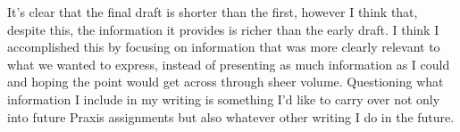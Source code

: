 \documentclass[11pt]{article}
\begin{document}
    It's clear that the final draft is shorter than the first, however I think that, despite this, the information it provides is richer than the early draft. I think I accomplished this by focusing on information that was more clearly relevant to what we wanted to express, instead of presenting as much information as I could and hoping the point would get across through sheer volume. Questioning what information I include in my writing is something I'd like to carry over not only into future Praxis assignments but also whatever other writing I do in the future.






\end{document}
